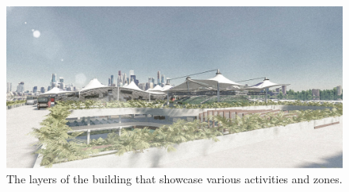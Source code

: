 ﻿%
\begin{figure}[H]
	\centering
	\includegraphics[width=\linewidth]{src/graphics/kalideres-integrated-bus-terminal--perspective-local-bus.jpg}
	\caption*{%
		The layers of the building that showcase various activities and zones.
	}
	\label{
		fig:kalideres-integrated-bus-terminal--perspective-local-bus
	}
\end{figure}
